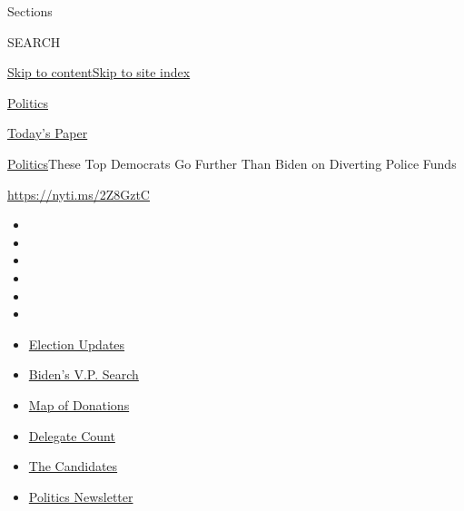 Sections

SEARCH

\protect\hyperlink{site-content}{Skip to
content}\protect\hyperlink{site-index}{Skip to site index}

\href{https://www.nytimes.com/section/politics}{Politics}

\href{https://myaccount.nytimes.com/auth/login?response_type=cookie\&client_id=vi}{}

\href{https://www.nytimes.com/section/todayspaper}{Today's Paper}

\href{/section/politics}{Politics}\textbar{}These Top Democrats Go
Further Than Biden on Diverting Police Funds

\url{https://nyti.ms/2Z8GztC}

\begin{itemize}
\item
\item
\item
\item
\item
\item
\end{itemize}

\begin{itemize}
\item
  \href{https://www.nytimes.com/2020/08/04/us/elections/primary-election-michigan-arizona-kansas.html?action=click\&pgtype=Article\&state=default\&region=TOP_BANNER\&context=storylines_menu}{Election
  Updates}
\item
  \href{https://www.nytimes.com/article/biden-vice-president-2020.html?action=click\&pgtype=Article\&state=default\&region=TOP_BANNER\&context=storylines_menu}{Biden's
  V.P. Search}
\item
  \href{https://www.nytimes.com/interactive/2020/07/24/us/politics/trump-biden-campaign-donors.html?action=click\&pgtype=Article\&state=default\&region=TOP_BANNER\&context=storylines_menu}{Map
  of Donations}
\item
  \href{https://www.nytimes.com/interactive/2020/us/elections/delegate-count-primary-results.html?action=click\&pgtype=Article\&state=default\&region=TOP_BANNER\&context=storylines_menu}{Delegate
  Count}
\item
  \href{https://www.nytimes.com/interactive/2019/us/politics/2020-presidential-candidates.html?action=click\&pgtype=Article\&state=default\&region=TOP_BANNER\&context=storylines_menu}{The
  Candidates}
\item
  \href{https://www.nytimes.com/newsletters/politics?action=click\&pgtype=Article\&state=default\&region=TOP_BANNER\&context=storylines_menu}{Politics
  Newsletter}
\end{itemize}


